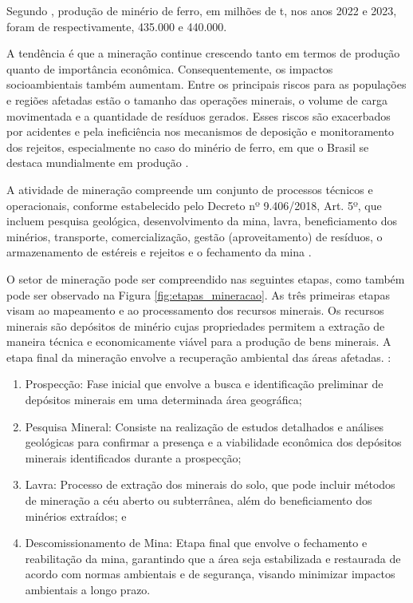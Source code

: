 Segundo \cite{usgs2024iron}, produção de minério de ferro, em milhões de t, nos
anos 2022 e 2023, foram de respectivamente, 435.000 e 440.000.

A tendência é que a mineração continue crescendo tanto em termos de
produção quanto de importância econômica. Consequentemente, os impactos
socioambientais também aumentam. Entre os principais riscos para as
populações e regiões afetadas estão o tamanho das operações minerais, o
volume de carga movimentada e a quantidade de resíduos gerados. Esses
riscos são exacerbados por acidentes e pela ineficiência nos mecanismos
de deposição e monitoramento dos rejeitos, especialmente no caso do
minério de ferro, em que o Brasil se destaca mundialmente em produção
\cite{carvalho2018sustentabilidade}.

A atividade de mineração compreende um conjunto de processos técnicos e
operacionais, conforme estabelecido pelo Decreto nº 9.406/2018, Art. 5º,
que incluem pesquisa geológica, desenvolvimento da mina, lavra,
beneficiamento dos minérios, transporte, comercialização, gestão
(aproveitamento) de resíduos, o armazenamento de estéreis e rejeitos e o
fechamento da mina \cite{decreto9406_2018}.

O setor de mineração pode ser compreendido nas seguintes etapas, como
também pode ser observado na Figura \ref{fig:etapas_mineracao}. As três primeiras etapas visam ao
mapeamento e ao processamento dos recursos minerais. Os recursos
minerais são depósitos de minério cujas propriedades permitem a extração
de maneira técnica e economicamente viável para a produção de bens
minerais. A etapa final da mineração envolve a recuperação ambiental das
áreas afetadas. \cite[p.340-341]{carvalho2018sustentabilidade}:

\begin{enumerate}
    \item Prospecção: Fase inicial que envolve a busca e identificação
    preliminar de depósitos minerais em uma determinada área geográfica;

    \item Pesquisa Mineral: Consiste na realização de estudos detalhados e
    análises geológicas para confirmar a presença e a viabilidade
    econômica dos depósitos minerais identificados durante a prospecção;

    \item Lavra: Processo de extração dos minerais do solo, que pode incluir
    métodos de mineração a céu aberto ou subterrânea, além do
    beneficiamento dos minérios extraídos; e

    \item Descomissionamento de Mina: Etapa final que envolve o fechamento e
    reabilitação da mina, garantindo que a área seja estabilizada e
    restaurada de acordo com normas ambientais e de segurança, visando
    minimizar impactos ambientais a longo prazo.
\end{enumerate}

